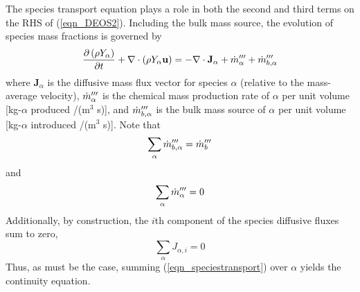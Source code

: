 The species transport equation plays a role in both the second and third terms on the RHS of (\ref{eqn_DEOS2}).  Including the bulk mass source, the evolution of species mass fractions is governed by
\begin{equation}
\label{eqn_speciestransport}
\frac{\partial \left(\rho Y_\alpha\right)}{\partial t} + \nabla\cdot \left(\rho Y_\alpha \mathbf{u}\right)  = - \nabla\cdot \mathbf{J}_{\alpha} + \dot{m}_\alpha^{{\prime\prime\prime}} + \dot{m}_{b,\alpha}^{{\prime\prime\prime}}
\end{equation}
where $\mathbf{J}_{\alpha}$ is the diffusive mass flux vector for species $\alpha$ (relative to the mass-average velocity),
$\dot{m}_\alpha^{{\prime\prime\prime}}$ is the chemical mass production rate of $\alpha$ per unit volume [kg-$\alpha$ produced /(m$^3$ s)],
and $\dot{m}_{b,\alpha}^{{\prime\prime\prime}}$ is the bulk mass source of $\alpha$ per unit volume [kg-$\alpha$ introduced /(m$^3$ s)].  Note that
\begin{equation}
\label{eqn_bulksum}
\sum_\alpha \dot{m}_{b,\alpha}^{{\prime\prime\prime}} = \dot{m}_b^{{\prime\prime\prime}}
\end{equation}
and
\begin{equation}
\label{eqn_massconservation}
\sum_\alpha \dot{m}_\alpha^{{\prime\prime\prime}} = 0
\end{equation}
Additionally, by construction, the $i$th component of the species diffusive fluxes sum to zero,
\begin{equation}
\label{eqn_sumdiffflux}
\sum_\alpha J_{\alpha,i} = 0
\end{equation}
Thus, as must be the case, summing (\ref{eqn_speciestransport}) over $\alpha$ yields the continuity equation.

